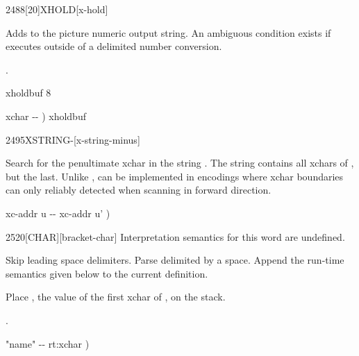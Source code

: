 \begin{worddef}{2488}[20]{XHOLD}[x-hold]
\item {}

	Adds  to the picture numeric output string.  An ambiguous
	condition exists if  executes outside of a 
	 delimited number conversion.

\see {}.

	\begin{implement}
	 xholdbuf 8 

	\word{:}   xchar -{}- )
		xholdbuf    \word{-}  \word{;}
	\end{implement}
\end{worddef}


\begin{worddef}[XSTRING-]{2495}{X\bs{}STRING-}[x-string-minus]
\item {}

	Search for the penultimate xchar in the string \param{xc-addr u_1}.
	The string  contains all xchars of
	, but the last.  Unlike \word{XCHAR-},
	 can be implemented in encodings where xchar
	boundaries can only reliably detected when scanning in forward
	direction.

	\begin{implement}
	\word{:}   xc-addr u -{}- xc-addr u' ) \\
	\tab {} \word{+}   \word{-} \word{;}
	\end{implement}
\end{worddef}


\begin{worddef}{2520}{[CHAR]}[bracket-char]
\interpret
	Interpretation semantics for this word are undefined.

\compile {}

	Skip leading space delimiters.  Parse  delimited by a space.
	Append the run-time semantics given below to the current definition.

\runtime {}

	Place , the value of the first xchar of , on
	the stack.

\see {}.

	\begin{implement}
	\word{:} \word{[CHAR]}  "name" -{}- rt:xchar ) \\
	\tab {}   \word{;} \word{IMMEDIATE}
	\end{implement}
\end{worddef}

\endinput
